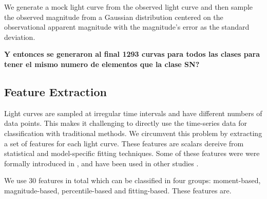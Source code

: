 \documentclass[a4paper,fleqn,usenatbib]{mnras}
\begin{document}
We generate a mock light curve from the observed light curve and 
then sample the observed magnitude from a Gaussian distribution
centered on the observational apparent magnitude with the magnitude's
error as the  standard deviation. 

{\bf Y entonces se generaron al final 1293 curvas para todos las
  clases para tener el mismo numero de elementos que la clase SN?}

\subsection{Feature Extraction} \label{subsection_extraction}

Light curves are sampled at irregular time intervals and have
different numbers of data points.
This makes it challenging to directly use the time-series data for
classification with traditional methods. 
We circumvent this problem by extracting a set of features for each
light curve.
These features are scalars dereive from statistical and model-specific
fitting techniques.
Some of these features were  were formally introduced in
\cite{1101.1959}, and have been used in other studies
\citep{1603.00882,1601.03931}.  

We use 30 features in total which can be classified in four groups:
moment-based, magnitude-based, percentile-based and fitting-based. 
These features are.
\end{document}
